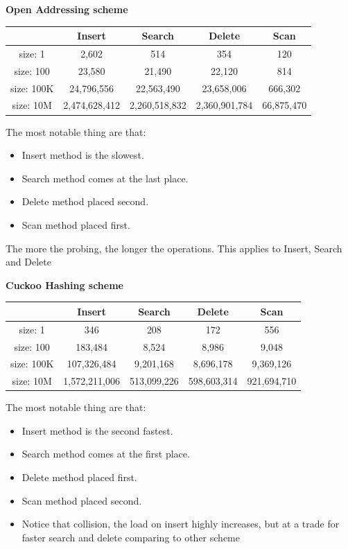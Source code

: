 \documentclass{article} %
\begin{document}
    \textbf{Open Addressing scheme}
    \begin{center}
        \begin{tabular}{|c|c|c|c|c|}\hline
        & Insert & Search & Delete & Scan\\\hline
        size: 1 & 2,602 & 514 & 354 & 120\\\hline
        size: 100 & 23,580 & 21,490 & 22,120 & 814\\\hline
        size: 100K & 24,796,556 & 22,563,490 & 23,658,006 & 666,302\\\hline
        size: 10M & 2,474,628,412 & 2,260,518,832 & 2,360,901,784 & 66,875,470\\\hline
        \end{tabular}
    \end{center}
    The most notable thing are that:
    \begin{itemize}
        \item Insert method is the slowest.
        \item Search method comes at the last place.
        \item Delete method placed second.
        \item Scan method placed first.
    \end{itemize}
    The more the probing, the longer the operations.
    This applies to Insert, Search and Delete

    \textbf{Cuckoo Hashing scheme}
    \begin{center}
        \begin{tabular}{|c|c|c|c|c|}\hline
        & Insert & Search & Delete & Scan\\\hline
        size: 1 & 346 & 208 & 172 & 556\\\hline
        size: 100 & 183,484 & 8,524 & 8,986 & 9,048\\\hline
        size: 100K & 107,326,484 & 9,201,168 & 8,696,178 & 9,369,126\\\hline
        size: 10M & 1,572,211,006 & 513,099,226 & 598,603,314 & 921,694,710\\\hline
        \end{tabular}
    \end{center}
    The most notable thing are that:
    \begin{itemize}
        \item Insert method is the second fastest.
        \item Search method comes at the first place.
        \item Delete method placed first.
        \item Scan method placed second.
        \item Notice that collision, the load on insert highly increases, but at a trade for faster search and delete comparing to other scheme
    \end{itemize}
\end{document}
